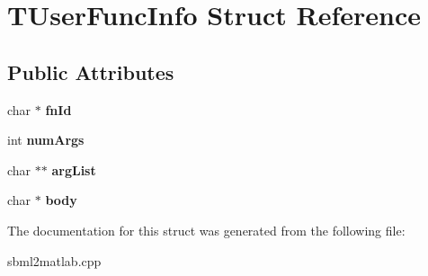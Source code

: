 \hypertarget{struct_t_user_func_info}{\section{T\-User\-Func\-Info Struct Reference}
\label{struct_t_user_func_info}
}
\subsection*{Public Attributes}
\begin{DoxyCompactItemize}
\item 
\hypertarget{struct_t_user_func_info_a93a42dcc50efe75bc37c4ec5cd92cc6c}{char $\ast$ {\bfseries fn\-Id}}\label{struct_t_user_func_info_a93a42dcc50efe75bc37c4ec5cd92cc6c}

\item 
\hypertarget{struct_t_user_func_info_adde7ceb12428822bc0a15a7430ebb3c8}{int {\bfseries num\-Args}}\label{struct_t_user_func_info_adde7ceb12428822bc0a15a7430ebb3c8}

\item 
\hypertarget{struct_t_user_func_info_a01eeb06f55703ec3d53e23d914646d61}{char $\ast$$\ast$ {\bfseries arg\-List}}\label{struct_t_user_func_info_a01eeb06f55703ec3d53e23d914646d61}

\item 
\hypertarget{struct_t_user_func_info_abdf08572bb0f586c676b7d23f6487026}{char $\ast$ {\bfseries body}}\label{struct_t_user_func_info_abdf08572bb0f586c676b7d23f6487026}

\end{DoxyCompactItemize}


The documentation for this struct was generated from the following file\-:\begin{DoxyCompactItemize}
\item 
sbml2matlab.\-cpp\end{DoxyCompactItemize}
